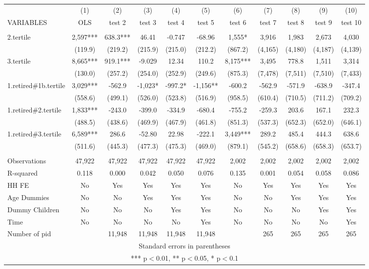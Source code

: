 \begin{tabular}{lcccccccccc} \hline
 & (1) & (2) & (3) & (4) & (5) & (6) & (7) & (8) & (9) & (10) \\
VARIABLES & OLS & test 2 & test 3 & test 4 & test 5 & test 6 & test 7 & test 8 & test 9 & test 10 \\ \hline
 &  &  &  &  &  &  &  &  &  &  \\
2.tertile & 2,597*** & 638.3*** & 46.41 & -0.747 & -68.96 & 1,555* & 3,916 & 1,983 & 2,673 & 4,030 \\
 & (119.9) & (219.2) & (215.9) & (215.0) & (212.2) & (867.2) & (4,165) & (4,180) & (4,187) & (4,139) \\
3.tertile & 8,665*** & 919.1*** & -9.029 & 12.34 & 110.2 & 8,175*** & 3,495 & 778.8 & 1,511 & 3,314 \\
 & (130.0) & (257.2) & (254.0) & (252.9) & (249.6) & (875.3) & (7,478) & (7,511) & (7,510) & (7,433) \\
1.retired\#1b.tertile & 3,029*** & -562.9 & -1,023* & -997.2* & -1,156** & -600.2 & -562.9 & -571.9 & -638.9 & -347.4 \\
 & (558.6) & (499.1) & (526.0) & (523.8) & (516.9) & (958.5) & (610.4) & (710.5) & (711.2) & (709.2) \\
1.retired\#2.tertile & 1,833*** & -243.0 & -399.0 & -334.9 & -680.4 & -755.2 & -259.3 & 203.6 & 167.1 & 232.3 \\
 & (488.5) & (438.6) & (469.9) & (467.9) & (461.8) & (851.3) & (537.3) & (652.3) & (652.0) & (646.1) \\
1.retired\#3.tertile & 6,589*** & 286.6 & -52.80 & 22.98 & -222.1 & 3,449*** & 289.2 & 485.4 & 444.3 & 638.6 \\
 & (511.6) & (445.3) & (477.3) & (475.3) & (469.0) & (879.1) & (545.2) & (658.6) & (658.3) & (653.7) \\
 &  &  &  &  &  &  &  &  &  &  \\
Observations & 47,922 & 47,922 & 47,922 & 47,922 & 47,922 & 2,002 & 2,002 & 2,002 & 2,002 & 2,002 \\
R-squared & 0.118 & 0.000 & 0.042 & 0.050 & 0.076 & 0.135 & 0.001 & 0.054 & 0.058 & 0.086 \\
HH FE & No & Yes & Yes & Yes & Yes & No & Yes & Yes & Yes & Yes \\
Age Dummies & No & No & Yes & Yes & Yes & No & No & Yes & Yes & Yes \\
Dummy Children & No & No & No & Yes & Yes & No & No & No & Yes & Yes \\
Time & No & No & No & No & Yes & No & No & No & No & Yes \\
 Number of pid &  & 11,948 & 11,948 & 11,948 & 11,948 &  & 265 & 265 & 265 & 265 \\ \hline
\multicolumn{11}{c}{ Standard errors in parentheses} \\
\multicolumn{11}{c}{ *** p$<$0.01, ** p$<$0.05, * p$<$0.1} \\
\end{tabular}
